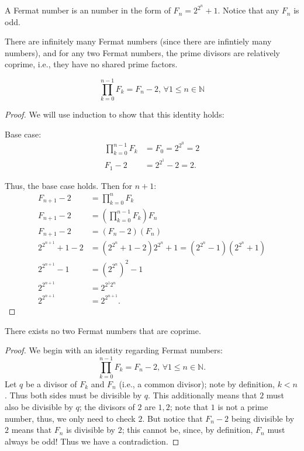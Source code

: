 \documentclass{article}
\begin{document}
\begin{definition}
A Fermat number is an number in the form of \( F_n=2^{2^n} +1 \). Notice that any \( F_n \) is odd. 
  
\end{definition}


There are infinitely many Fermat numbers (since there are infintiely many numbers), and for any two Fermat numbers, the prime divisors are relatively coprime, i.e., they have no shared prime factors.

\-

\begin{theorem}
  
  \begin{displaymath}
     \prod_{k=0}^{n-1}F_k=F_n-2, \,  \forall 1\leq n\in \mathbb{N}
  \end{displaymath}
  
\end{theorem}


\begin{proof}
  We will use induction to show that this identity holds:

  Base case:
  \begin{align*}
    \prod_{k=0}^{n-1}F_k &= F_0=2^{2^0}=2 \\
    F_1-2 &= 2^{2^1}-2=2.
  \end{align*}

Thus, the base case holds. Then for \( n+1 \):
\begin{align*}
  F_{n+1}-2&=\prod_{k=0}^n F_k \\ 
  F_{n+1}-2&=\left( \prod_{k=0}^{n-1}F_k\right)F_n \\
  F_{n+1}-2&=(F_n-2)(F_n) \\ 
  2^{2^{n+1}}+1-2&=(2^{2^n}+1-2)2^{2^n}+1 = (2^{2^n}-1)(2^{2^n}+1) \\
  2^{2^{n+1}}-1&=(2^{2^n})^2-1 \\ 
  2^{2^{n+1}}&=2^{2^{1}2^n} \\ 
  2^{2^{n+1}}&=2^{2^{n+1}}. 
\end{align*}

\end{proof}

\begin{theorem}
  There exists no two Fermat numbers that are coprime.
\end{theorem}

\begin{proof}
  We begin with an identity regarding Fermat numbers:
  \[
    \prod_{k=0}^{n-1}F_k=F_n-2, \,  \forall 1\leq n\in \mathbb{N}
  .\] 
Let \( q \) be a divisor of \( F_k \) and \( F_n\) (i.e., a common divisor); note by definition, \( k<n \). Thus both sides must be divisible by \( q \). This additionally means that \( 2 \) must also be divisible by \( q \); the divisors of \( 2 \) are \( 1,2 \); note that \( 1 \) is not a prime number, thus, we only need to check \( 2 \). But notice that \( F_n-2 \) being divisible by \( 2 \) means that \( F_n \) is divisible by \( 2 \); this cannot be, since, by definition, \( F_n \) must always be odd! Thus we have a contradiction. 
\end{proof}
\end{document}
